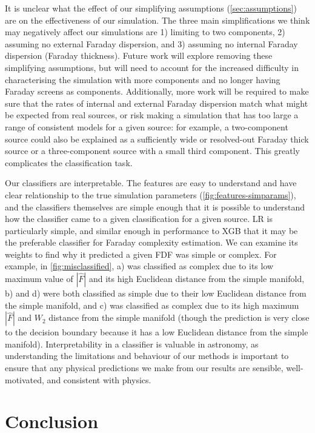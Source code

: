   It is unclear what the effect of our simplifying assumptions (\autoref{sec:assumptions}) are on the effectiveness of our simulation. The three main simplifications we think may negatively affect our simulations are 1) limiting to two components, 2) assuming no external Faraday dispersion, and 3) assuming no internal Faraday dispersion (Faraday thickness). Future work will explore removing these simplifying assumptions, but will need to account for the increased difficulty in characterising the simulation with more components and no longer having Faraday screens as components. Additionally, more work will be required to make sure that the rates of internal and external Faraday dispersion match what might be expected from real sources, or risk making a simulation that has too large a range of consistent models for a given source: for example, a two-component source could also be explained as a sufficiently wide or resolved-out Faraday thick source or a three-component source with a small third component. This greatly complicates the classification task.

  Our classifiers are interpretable. The features are easy to understand and have clear relationship to the true simulation parameters (\autoref{fig:features-simparams}), and the classifiers themselves are simple enough that it is possible to understand how the classifier came to a given classification for a given source. LR is particularly simple, and similar enough in performance to XGB that it may be the preferable classifier for Faraday complexity estimation. We can examine its weights to find why it predicted a given FDF was simple or complex. For example, in \autoref{fig:misclassified}, a) was classified as complex due to its low maximum value of $|\hat F|$ and its high Euclidean distance from the simple manifold, b) and d) were both classified as simple due to their low Euclidean distance from the simple manifold, and c) was classified as complex due to its high maximum $|\hat F|$ and $W_2$ distance from the simple manifold (though the prediction is very close to the decision boundary because it has a low Euclidean distance from the simple manifold). Interpretability in a classifier is valuable in astronomy, as understanding the limitations and behaviour of our methods is important to ensure that any physical predictions we make from our results are sensible, well-motivated, and consistent with physics.

\section{Conclusion}
\label{sec:faraday-conclusion}

